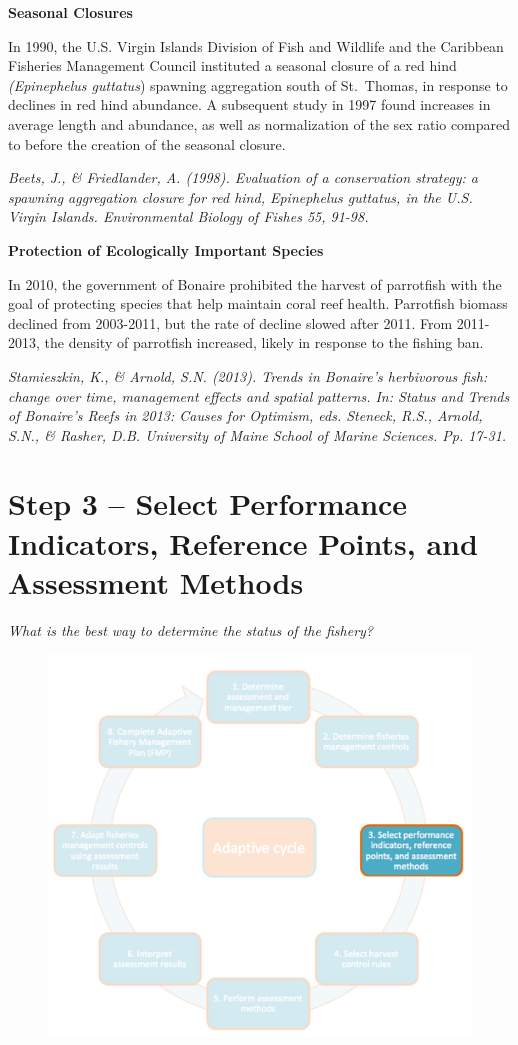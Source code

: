 \documentclass[]{book}
\begin{document}
\textbf{Seasonal Closures}

In 1990, the U.S. Virgin Islands Division of Fish and Wildlife and the
Caribbean Fisheries Management Council instituted a seasonal closure of
a red hind \emph{(Epinephelus guttatus}) spawning aggregation south of
St.~Thomas, in response to declines in red hind abundance. A subsequent
study in 1997 found increases in average length and abundance, as well
as normalization of the sex ratio compared to before the creation of the
seasonal closure.

\emph{Beets, J., \& Friedlander, A. (1998). Evaluation of a conservation
strategy: a spawning aggregation closure for red hind, Epinephelus
guttatus, in the U.S. Virgin Islands. Environmental Biology of Fishes
55, 91-98.}

\textbf{Protection of Ecologically Important Species}

In 2010, the government of Bonaire prohibited the harvest of parrotfish
with the goal of protecting species that help maintain coral reef
health. Parrotfish biomass declined from 2003-2011, but the rate of
decline slowed after 2011. From 2011-2013, the density of parrotfish
increased, likely in response to the fishing ban.

\emph{Stamieszkin, K., \& Arnold, S.N. (2013). Trends in Bonaire's
herbivorous fish: change over time, management effects and spatial
patterns. In: Status and Trends of Bonaire's Reefs in 2013: Causes for
Optimism, eds. Steneck, R.S., Arnold, S.N., \& Rasher, D.B. University
of Maine School of Marine Sciences. Pp. 17-31.}

\chapter{Step 3 -- Select Performance Indicators, Reference Points, and
Assessment Methods}\label{Step3}

\emph{What is the best way to determine the status of the fishery?}

\begin{figure}
\centering
\includegraphics{myMediaFolder/media/Step3.png}
\caption{}
\end{figure}
\end{document}
